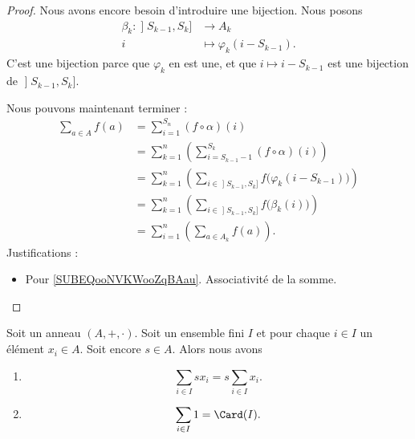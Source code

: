 \begin{proof}
	Nous avons encore besoin d'introduire une bijection. Nous posons
	\begin{equation}
		\begin{aligned}
			\beta_k\colon \mathopen] S_{k-1} , S_k \mathclose] & \to A_k                       \\
			i                                                  & \mapsto \varphi_k(i-S_{k-1}).
		\end{aligned}
	\end{equation}
	C'est une bijection parce que \( \varphi_k\) en est une, et que \( i\mapsto i-S_{k-1}\) est une bijection de \( \mathopen] S_{k-1} , S_k \mathclose]\).

	Nous pouvons maintenant terminer :
	\begin{subequations}
		\begin{align}
			\sum_{a\in A}f(a) & =\sum_{i=1}^{S_n}(f\circ \alpha)(i)                                                                            \\
			                  & =\sum_{k=1}^n\left( \sum_{i=S_{k-1}-1}^{S_k}(f\circ \alpha)(i) \right)        \label{SUBEQooNVKWooZqBAau}      \\
			                  & =\sum_{k=1}^n\left( \sum_{i\in \mathopen] S_{k-1} , S_k \mathclose]}f\big( \varphi_k(i-S_{k-1}) \big)  \right) \\
			                  & =\sum_{k=1}^n\left( \sum_{i\in \mathopen] S_{k-1} , S_k \mathclose]}f\big( \beta_k(i) \big) \right)            \\
			                  & =\sum_{i=1}^n\left( \sum_{a\in A_k}f(a) \right).
		\end{align}
	\end{subequations}
	Justifications :
	\begin{itemize}
		\item Pour \eqref{SUBEQooNVKWooZqBAau}. Associativité de la somme.
	\end{itemize}
\end{proof}

\begin{lemma}	\label{LEMooUWMYooIHdoeZ}
	Soit un anneau \( (A,+,\cdot)\). Soit un ensemble fini \( I\) et pour chaque \( i\in I\) un élément \( x_i\in A\). Soit encore \( s\in A\). Alors nous avons
	\begin{enumerate}
		\item		\label{ITEMooUVAIooETyzyc}
		      \begin{equation}
			      \sum_{i\in I}sx_i=s\sum_{i\in I}x_i.
		      \end{equation}
		\item		\label{ITEMooQIILooDbRnRJ}
		      \begin{equation}
			      \sum_{i\in I}1=\Card(I).
		      \end{equation}
	\end{enumerate}
\end{lemma}

